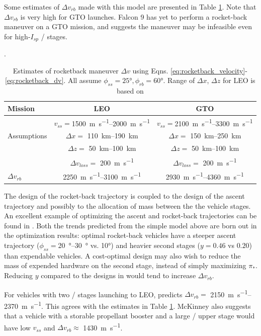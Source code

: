 \documentclass[conf]{new-aiaa}
\begin{document}
Some estimates of $\Delta v_{rb}$ made with this model are presented in Table \ref{tab:rocketback}. Note that $\Delta v_{rb}$ is very high for GTO launches. Falcon 9 has yet to perform a rocket-back maneuver on a GTO mission, and \cite{Dumont2017} suggests the maneuver may be infeasible even for high-$I_{sp}$ / stages.

\begin{table}
	\caption{\label{tab:rocketback} Estimates of rocketback maneuver $\Delta v$ using Eqns. \ref{eq:rocketback_velocity}-\ref{eq:rocketback_dv}. All assume $\phi_{ss}=\ang{25}, \phi_{rb}=\ang{60}$. Range of $\Delta x$, $\Delta z$ for LEO is based on \cite{McKinney1986}}.
	\centering
	\begin{tabular}{l c c}
		Mission & LEO & GTO \\
		\hline
		& $v_{ss} = $\SIrange{1500}{2000}{\meter\per\second} & $v_{ss} = $\SIrange{2100}{3300}{\meter\per\second} \\
		Assumptions & $\Delta x = $ \SIrange{110}{190}{\kilo\meter} & $\Delta x = $ \SIrange{150}{250}{\kilo\meter} \\
		& $\Delta z = $ \SIrange{50}{100}{\kilo\meter} & $\Delta z = $ \SIrange{50}{100}{\kilo\meter} \\
		& $\Delta v_{loss} =$ \SI{200}{\meter\per\second} & $\Delta v_{loss} =$ \SI{200}{\meter\per\second} \\
		\hline
		$\Delta v_{rb}$ & \SIrange{2250}{3100}{\meter\per\second} & \SIrange{2930}{4360}{\meter\per\second}
		
	\end{tabular}
\end{table}

The design of the rocket-back trajectory is coupled to the design of the ascent trajectory and possibly to the allocation of mass between the the vehicle stages. An excellent example of optimizing the ascent and rocket-back trajectories can be found in \cite{McKinney1986}. Both the trends predicted from the simple model above are born out in the optimization results: optimal rocket-back vehicles have a steeper ascent trajectory ($\phi_{ss} = $\SIrange{20}{30}{\degree} vs. \ang{10}) and heavier second stages ($y=0.46$ vs $0.20$) than expendable vehicles. A cost-optimal design may also wish to reduce the mass of expended hardware on the second stage, instead of simply maximizing $\pi_*$. Reducing $y$ compared to the designs in \cite{McKinney1986} would tend to increase $\Delta v_{rb}$.

For vehicles with two / stages launching to LEO, \cite{McKinney1986} predicts $\Delta v_{rb} =$ \SIrange{2150}{2370}{\meter\per\second}. This agrees with the estimates in Table \ref{tab:rocketback}. McKinney also suggests that a vehicle with a storable propellant booster and a large / upper stage would have low $v_{ss}$ and $\Delta v_{rb} \approx$ \SI{1430}{\meter\per\second}.
\end{document}
